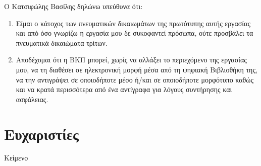 Ο Κατσιφώλης Βασίλης δηλώνω υπεύθυνα ότι:

\begin{enumerate}
\item Είμαι ο κάτοχος των πνευματικών δικαιωμάτων της πρωτότυπης αυτής εργασίας και από όσο γνωρίζω η εργασία μου δε συκοφαντεί πρόσωπα, ούτε προσβάλει τα πνευματικά δικαιώματα τρίτων.
\item Αποδέχομαι ότι η ΒΚΠ μπορεί, χωρίς να αλλάξει το περιεχόμενο της εργασίας μου, να τη διαθέσει σε ηλεκτρονική μορφή μέσα από τη ψηφιακή Βιβλιοθήκη της, να την αντιγράψει σε οποιοδήποτε μέσο ή/και σε οποιοδήποτε μορφότυπο καθώς και να κρατά περισσότερα από ένα αντίγραφα για λόγους συντήρησης και ασφάλειας.
\end{enumerate}

\pagebreak
\section*{Ευχαριστίες}
Κείμενο
\pagebreak
